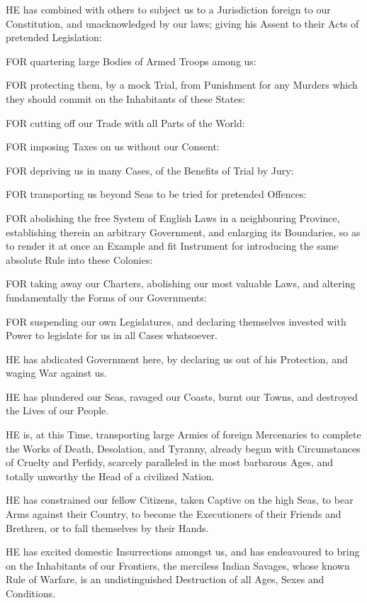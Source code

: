 HE has combined with others to subject us to a Jurisdiction foreign to our Constitution, and unacknowledged by our laws; giving his Assent to their Acts of pretended Legislation:

FOR quartering large Bodies of Armed Troops among us:

FOR protecting them, by a mock Trial, from Punishment for any Murders which they should commit on the Inhabitants of these States:

FOR cutting off our Trade with all Parts of the World:

FOR imposing Taxes on us without our Consent:

FOR depriving us in many Cases, of the Benefits of Trial by Jury:

FOR transporting us beyond Seas to be tried for pretended Offences:

FOR abolishing the free System of English Laws in a neighbouring Province, establishing therein an arbitrary Government, and enlarging its Boundaries, so as to render it at once an Example and fit Instrument for introducing the same absolute Rule into these Colonies:

FOR taking away our Charters, abolishing our most valuable Laws, and altering fundamentally the Forms of our Governments:

FOR suspending our own Legislatures, and declaring themselves invested with Power to legislate for us in all Cases whatsoever.

HE has abdicated Government here, by declaring us out of his Protection, and waging War against us.

HE has plundered our Seas, ravaged our Coasts, burnt our Towns, and destroyed the Lives of our People.

HE is, at this Time, transporting large Armies of foreign Mercenaries to complete the Works of Death, Desolation, and Tyranny, already begun with Circumstances of Cruelty and Perfidy, scarcely paralleled in the most barbarous Ages, and totally unworthy the Head of a civilized Nation.

HE has constrained our fellow Citizens, taken Captive on the high Seas, to bear Arms against their Country, to become the Executioners of their Friends and Brethren, or to fall themselves by their Hands.

HE has excited domestic Insurrections amongst us, and has endeavoured to bring on the Inhabitants of our Frontiers, the merciless Indian Savages, whose known Rule of Warfare, is an undistinguished Destruction of all Ages, Sexes and Conditions.


